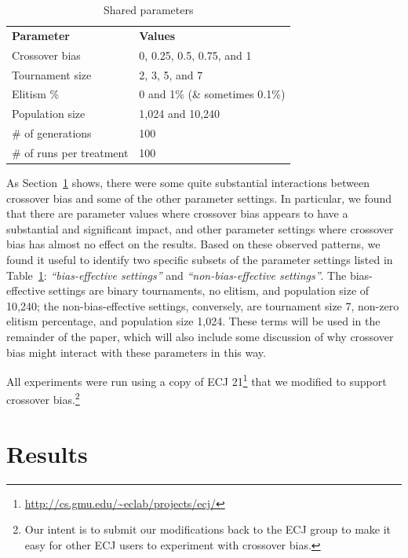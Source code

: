 \documentclass{sig-alternate}
\begin{document}
\begin{table}[tb]
\begin{center}
\begin{tabular}{ll}
\textbf{Parameter} & \textbf{Values} \\
Crossover bias & 0, 0.25, 0.5, 0.75, and 1 \\
Tournament size & 2, 3, 5, and 7 \\
Elitism \% & 0 and 1\% (\& sometimes 0.1\%) \\
Population size & 1,024 and 10,240 \\
\# of generations & 100 \\
\# of runs per treatment & 100
\end{tabular}
\end{center}
\vspace{-0.5cm}
\caption{Shared parameters}
\label{tab:sharedParameters}
\end{table}

As Section~\ref{sec:Results} shows, there were some quite substantial interactions between 
crossover bias and some of the other parameter settings. In particular, we found that there are 
parameter values where crossover bias appears to have a substantial and significant impact, 
and other parameter settings
where crossover bias has almost no effect on the results. 
Based on these observed patterns, 
we found it useful to identify two specific subsets of the parameter settings listed in 
Table~\ref{tab:sharedParameters}: \emph{``bias-effective settings''} and 
\emph{``non-bias-effective settings''}.
The bias-effective settings are binary tournaments, no elitism, and population size of 10,240; 
the non-bias-effective settings, conversely, are tournament size 7, non-zero elitism percentage, 
and population size 1,024. These terms will be used in the remainder of the paper, which will 
also include some discussion of why crossover bias might interact with these parameters in this way.

All experiments were run using a copy of ECJ 21\footnote{\url{http://cs.gmu.edu/~eclab/projects/ecj/}} 
that we modified to support crossover bias.\footnote{Our intent is to submit our modifications back to the 
ECJ group to make it easy for other ECJ users to experiment with crossover bias.}

\section{Results} \label{sec:Results}
\end{document}
